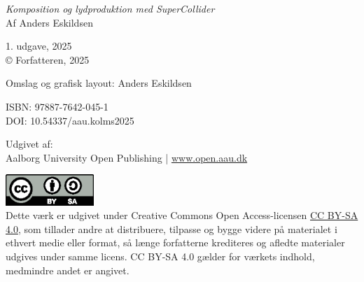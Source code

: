 \thispagestyle{empty}

\vspace{4em}
\emph{Komposition og lydproduktion med SuperCollider} \\
Af Anders Eskildsen

1. udgave, 2025 \\
\copyright{} Forfatteren, 2025

Omslag og grafisk layout: Anders Eskildsen

ISBN: 97887-7642-045-1 \\
DOI: 10.54337/aau.kolms2025

Udgivet af: \\
Aalborg University Open Publishing | \href{https://www.open.aau.dk}{www.open.aau.dk}

\vspace{1em}
\href{https://creativecommons.org/licenses/by-sa/4.0/}{\includegraphics[width=0.25\textwidth]{book_media/cc-by-sa.eps}} \\
Dette værk er udgivet under Creative Commons Open Access-licensen \href{https://creativecommons.org/licenses/by-sa/4.0/}{CC BY-SA 4.0}, som tillader andre at distribuere, tilpasse og bygge videre på materialet i ethvert medie eller format, så længe forfatterne krediteres og afledte materialer udgives under samme licens. CC BY-SA 4.0 gælder for værkets indhold, medmindre andet er angivet.
